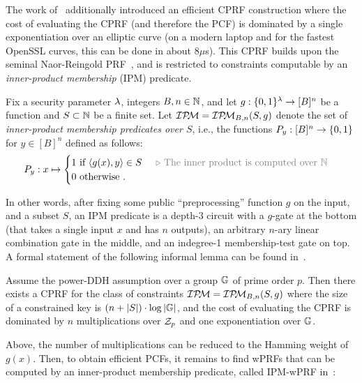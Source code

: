 The work of~\cite{EC:BCMPR24} additionally introduced an efficient CPRF construction where the cost of evaluating the CPRF (and therefore the PCF) is dominated by a single exponentiation over an elliptic curve (on a modern laptop and for the fastest {\sf OpenSSL} curves, this can be done in about $8\mu$s). This CPRF builds upon the seminal Naor-Reingold PRF~\cite{FOCS:NaoRei97}, and is restricted to constraints computable by an \emph{inner-product membership} (IPM) predicate.
\begin{definition}
Fix a security parameter $\lambda$, integers $B,n \in \mathbb{N}$, and let $g:\{0,1\}^\lambda \to [B]^n$ be a function and $S \subset \mathbb{N}$ be a finite set. Let $\mathcal{IP\mkern-4mu M} = \mathcal{IP\mkern-4mu M}_{B,n}(S,g)$ denote the set of \emph{inner-product membership predicates over $S$}, i.e., the functions $P_{y}:[B]^n\to \{0,1\}$ for $y \in [B]^n$ defined as follows:
\[P_{y}:x\mapsto \begin{cases} 1 \text{ if } \langle g(x),y\rangle \in S \algcomment{The inner product is computed over $\N$}\\
0 \text{ otherwise}~.
\end{cases}\]
\end{definition}
In other words, after fixing some public ``preprocessing'' function $g$ on the input, and a subset $S$, an IPM predicate is a depth-$3$ circuit with a $g$-gate at the bottom (that takes a single input $x$ and has $n$ outputs), an arbitrary $n$-ary linear combination gate in the middle, and an indegree-1 membership-test gate on top. A formal statement of the following informal lemma can be found in~\cite{EC:BCMPR24}.
\begin{lemma}[Informal]
\label{lemma:efficient-cprf}
Assume the power-DDH assumption over a group $\mathbb{G}$ of prime order $p$. Then there exists a CPRF for the class of constraints $\mathcal{IP\mkern-4mu M} = \mathcal{IP\mkern-4mu M}_{B,n}(S,g)$ where the size of a constrained key is $(n+|S|)\cdot \log|\mathbb{G}|$, and the cost of evaluating the CPRF is dominated by $n$ multiplications over $\mathcal{Z}_p$ and one exponentiation over $\mathbb{G}$.
\end{lemma}

Above, the number of multiplications can be reduced to the Hamming weight of $g(x)$. Then, to obtain efficient PCFs, it remains to find wPRFs that can be computed by an inner-product membership predicate, called IPM-wPRF in~\cite{EC:BCMPR24}:


